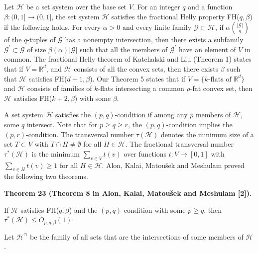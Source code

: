 \documentclass[10pt,a4paper]{amsart}
\begin{document}
\par
\par
Let $\mathcal{H}$ be a set system over the base set $V$. For an integer $q$ and a function $\beta\colon(0,1]\to(0,1]$, the set system $\mathcal{H}$ satisfies the fractional Helly property FH($q,\beta$) if the following holds. For every $\alpha>0$ and every finite family $\mathcal{G}\subset\mathcal{H}$, if $\alpha\binom{|\mathcal{G}|}{q}$ of the $q$-tuples of $\mathcal{G}$ has a nonempty intersection, then there exists a subfamily $\mathcal{G}^{\prime}\subset\mathcal{G}$ of size $\beta(\alpha)|\mathcal{G}|$ such that all the members of $\mathcal{G}^{\prime}$ have an element of $V$ in common. The fractional Helly theorem of Katchalski and Liu (Theorem 1) states that if $V=\mathbb{R}^{d}$, and $\mathcal{H}$ consists of all the convex sets, then there exists $\beta$ such that $\mathcal{H}$ satisfies FH($d+1,\beta$). Our Theorem 5 states that if $V=\{k\text{-flats of }\mathbb{R}^{d}\}$ and $\mathcal{H}$ consists of families of $k$-flats intersecting a common $\rho$-fat convex set, then $\mathcal{H}$ satisfies FH($k+2,\beta$) with some $\beta$.
\par
\par
A set system $\mathcal{H}$ satisfies the $(p,q)$-condition if among any $p$ members of $\mathcal{H}$, some $q$ intersect. Note that for $p\geq q\geq r$, the $(p,q)$-condition implies the $(p,r)$-condition. The transversal number $\tau(\mathcal{H})$ denotes the minimum size of a set $T\subset V$ with $T\cap H\neq\emptyset$ for all $H\in\mathcal{H}$. The fractional transversal number $\tau^{*}(\mathcal{H})$ is the minimum $\sum_{v\in V}t(v)$ over functions $t\colon V\to[0,1]$ with $\sum_{v\in H}t(v)\geq 1$ for all $H\in\mathcal{H}$. Alon, Kalai, Matoušek and Meshulam proved the following two theorems.
\par
\par
\par\medskip\noindent\textbf{Theorem 23 (Theorem 8 in Alon, Kalai, Matoušek and Meshulam [2]).}\par
If $\mathcal{H}$ satisfies FH($q,\beta$) and the $(p,q)$-condition with some $p\geq q$, then $\tau^{*}(\mathcal{H})\leq O_{p,q,\beta}(1)$.
\par
\par
\par
Let $\mathcal{H}^{\cap}$ be the family of all sets that are the intersections of some members of $\mathcal{H}$.
\end{document}
